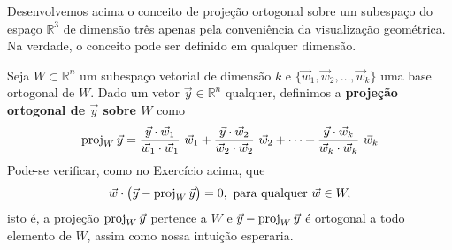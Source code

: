 \documentclass[../livro.tex]{subfiles}  %
\begin{document}
Desenvolvemos acima o conceito de projeção ortogonal sobre um subespaço do espaço $\mathbb{R}^3$ de dimensão três apenas pela conveniência da visualização geométrica. Na verdade, o conceito pode ser definido em qualquer dimensão.

Seja $W \subset \mathbb{R}^n$ um subespaço vetorial de dimensão $k$ e $\{\vec{w}_1, \vec{w}_2, \dots, \vec{w}_k \}$ uma base ortogonal de $W$. Dado um vetor $\vec{y} \in \mathbb{R}^n$ qualquer, definimos a \textbf{projeção ortogonal de $\vec{y}$ sobre $W$} como
\begin{equation}
\proj_W \vec{y}  = \frac{\vec{y} \cdot \vec{w}_1}{\vec{w}_1 \cdot \vec{w}_1} \ \vec{w}_1 + \frac{\vec{y} \cdot \vec{w}_2}{\vec{w}_2 \cdot \vec{w}_2} \ \vec{w}_2 + \cdots + \frac{\vec{y} \cdot \vec{w}_k}{\vec{w}_k \cdot \vec{w}_k} \ \vec{w}_k
\end{equation} Pode-se verificar, como no Exercício acima, que
\begin{equation}
\vec{w} \cdot  \big( \vec{y} - \operatorname{proj}_W \vec{y} \big) = 0, \ \text{para qualquer } \vec{w} \in W,
\end{equation} isto é, a projeção $\operatorname{proj}_W \vec{y}$ pertence a $W$ e $\vec{y} - \operatorname{proj}_W \vec{y}$ é ortogonal a todo elemento de $W$, assim como nossa intuição esperaria.
\end{document}
